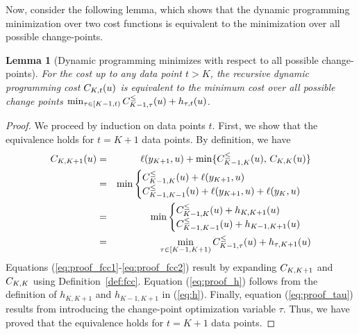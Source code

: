 \documentclass{article}
\newtheorem{lemma}{Lemma}
\begin{document}
Now, consider the following lemma, which shows that the dynamic
programming minimization over two cost functions is equivalent to the
minimization over all possible change-points.
\begin{lemma}[Dynamic programming minimizes with respect to all possible change-points]
\label{lemma:t_change_points}
  For the cost up to any data point $t> K$, the recursive dynamic
  programming cost $C_{K,t}(u)$ is equivalent to the minimum cost
  over all possible change points
  $\min_{\tau\in[K-1,t)}C_{K-1,\tau}^\leq(u)+h_{\tau,t}(u)$.
\end{lemma}

\begin{proof}
  We proceed by induction on data points $t$. First, we show that the
  equivalence holds for $t=K+1$ data points. By definition, we have
  \begin{eqnarray}
    C_{K,K+1}(u)
    &=&\label{eq:proof_fcc1}\ell(y_{K+1},u)+\min\{C_{K-1,K}^\leq(u),\,C_{K,K}(u)\}\\
    &=&\min\label{eq:proof_fcc2}
        \begin{cases}
          C_{K-1,K}^\leq(u)+\ell(y_{K+1},u)\\
          C_{K-1,K-1}^\leq(u)+\ell(y_{K+1},u)+\ell(y_K,u)
        \end{cases}\\
    &=&\min\label{eq:proof_h}
        \begin{cases}
          C_{K-1,K}^\leq(u)+h_{K,K+1}(u)\\
          C_{K-1,K-1}^\leq(u)+h_{K-1,K+1}(u)
        \end{cases}\\
    \label{eq:proof_tau}
    &=&\min_{\tau\in[K-1,K+1)} C_{K-1,\tau}^\leq(u)+h_{\tau,K+1}(u)
  \end{eqnarray}
  Equations (\ref{eq:proof_fcc1}-\ref{eq:proof_fcc2}) result by
  expanding $C_{K,K+1}$ and $C_{K,K}$ using
  Definition~\ref{def:fcc}. Equation (\ref{eq:proof_h}) follows from
  the definition of $h_{K,K+1}$ and $h_{K-1,K+1}$ in
  (\ref{eq:h}). Finally, equation (\ref{eq:proof_tau}) results from
  introducing the change-point optimization variable $\tau$. Thus, we
  have proved that the equivalence holds for $t=K+1$ data points.


\end{proof}
\end{document}
